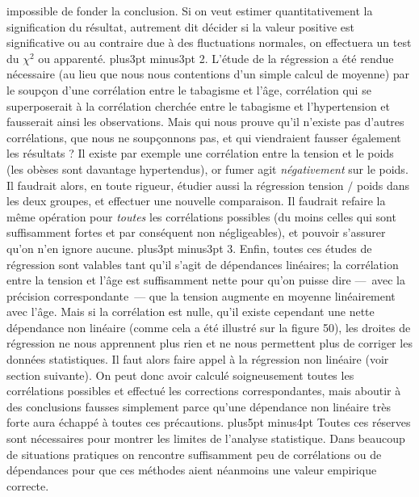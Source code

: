 impossible de fonder la conclusion. Si on veut estimer 
quantitativement la signification du r\'esultat, autrement dit d\'ecider 
si la valeur positive est significative ou au contraire due \`a des 
fluctuations normales, on effectuera un test du $\chi^2$ ou apparent\'e. 
\vskip4pt plus3pt minus3pt 
2. L'\'etude de la r\'egression a \'et\'e rendue n\'ecessaire (au lieu que
nous nous contentions d'un simple calcul de moyenne) par le soup\c{c}on 
d'une corr\'elation entre le tabagisme et l'\^age, corr\'elation qui se 
superposerait \`a la corr\'elation cherch\'ee entre le tabagisme et 
l'hypertension et fausserait ainsi les observations. Mais qui nous
prouve qu'il n'existe pas d'autres corr\'elations, que nous ne
soup\c{c}onnons pas, et qui viendraient fausser \'egalement les
r\'esultats ?  Il existe par exemple une corr\'elation entre la tension
et le poids (les ob\`eses sont davantage hypertendus), or fumer agit
{\it n\'egativement} sur le poids.  Il faudrait alors, en toute rigueur, 
\'etudier aussi la r\'egression tension $/$ poids dans les deux groupes, 
et effectuer une nouvelle comparaison.  Il faudrait refaire la m\^eme 
op\'eration pour {\it toutes} les corr\'elations possibles (du moins 
celles qui sont suffisamment fortes et par cons\'equent non 
n\'egligeables), et pouvoir s'assurer qu'on n'en ignore aucune. 
\vskip4pt plus3pt minus3pt 
3. Enfin, toutes ces \'etudes de r\'egression sont valables tant qu'il
s'agit de d\'ependances lin\'eaires; la corr\'elation entre la tension et 
l'\^age est suf\-fisam\-ment nette pour qu'on puisse dire ---~avec la 
pr\'ecision correspondante~--- que la tension augmente en moyenne 
lin\'eairement avec l'\^age. Mais si la corr\'elation est nulle, qu'il
existe cependant une nette d\'ependance non lin\'eaire (comme cela a 
\'et\'e illustr\'e sur la figure 50), les droites de r\'egression ne nous 
apprennent plus rien et ne nous permettent plus de corriger les 
donn\'ees statistiques. Il faut alors faire appel \`a la r\'egression 
non lin\'eaire (voir section suivante). On peut donc avoir calcul\'e 
soigneusement toutes les corr\'elations possibles et effectu\'e les 
corrections correspondantes, mais aboutir \`a des conclusions 
fausses simplement parce qu'une d\'ependance non lin\'eaire 
tr\`es forte aura \'echapp\'e \`a toutes ces pr\'ecautions. 
\vskip8pt plus5pt minus4pt 
Toutes ces r\'eserves sont n\'ecessaires pour montrer les limites de 
l'analyse statistique. Dans beaucoup de situations pratiques on 
rencontre suffisamment peu de corr\'elations ou de d\'ependances pour 
que ces m\'ethodes aient n\'eanmoins une valeur empirique correcte. 
